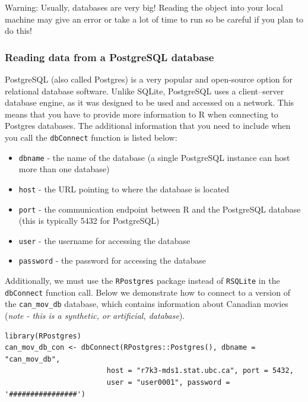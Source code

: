 \documentclass[
]{krantz}
\providecommand{\tightlist}{%
  \setlength{\itemsep}{0pt}\setlength{\parskip}{0pt}}
\renewenvironment{quote}{\begin{VF}}{\end{VF}}
\begin{document}
\begin{quote}
Warning: Usually, databases are very big! Reading the object into your local machine may give an error or take a lot of time to run so be careful if you plan to do this!
\end{quote}

\hypertarget{reading-data-from-a-postgresql-database}{%
\subsubsection{Reading data from a PostgreSQL database}\label{reading-data-from-a-postgresql-database}}

PostgreSQL (also called Postgres) is a very popular and open-source option for relational database software. Unlike SQLite, PostgreSQL uses
a client--server database engine, as it was designed to be used and accessed on a network. This means that you have to provide more
information to R when connecting to Postgres databases. The additional information that you need to include when you call the \texttt{dbConnect}
function is listed below:

\begin{itemize}
\tightlist
\item
  \texttt{dbname} - the name of the database (a single PostgreSQL instance can host more than one database)
\item
  \texttt{host} - the URL pointing to where the database is located
\item
  \texttt{port} - the communication endpoint between R and the PostgreSQL database (this is typically 5432 for PostgreSQL)
\item
  \texttt{user} - the username for accessing the database
\item
  \texttt{password} - the password for accessing the database
\end{itemize}

Additionally, we must use the \texttt{RPostgres} package instead of \texttt{RSQLite} in the \texttt{dbConnect} function call.
Below we demonstrate how to connect to a version of the \texttt{can\_mov\_db} database, which contains information about Canadian movies (\emph{note - this is a synthetic, or artificial, database}).

\begin{verbatim}
library(RPostgres)
can_mov_db_con <- dbConnect(RPostgres::Postgres(), dbname = "can_mov_db",
                        host = "r7k3-mds1.stat.ubc.ca", port = 5432,
                        user = "user0001", password = '################')
\end{verbatim}
\end{document}
